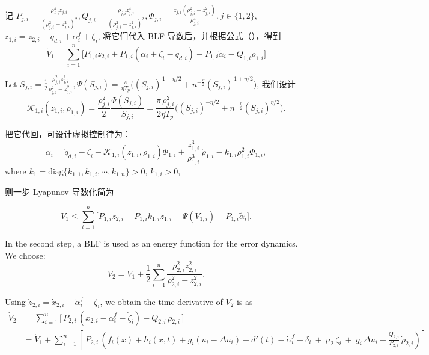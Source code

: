 \documentclass[pdflatex,sn-mathphys-num]{sn-jnl}%
\theoremstyle{thmstyleone}%
\theoremstyle{thmstyletwo}%
\theoremstyle{thmstylethree}%
\begin{document}
记
$
P_{j,i}=\frac{\rho_{j,i}^4 z_{j,i}}{(\rho_{j,i}^2-z_{j,i}^2)^2},
Q_{j,i}=\frac{\rho_{j,i} z_{j,i}^4}{(\rho_{j,i}^2-z_{j,i}^2)^2},
\Phi_{j,i}=\frac{z_{j,i}\left(\rho_{j,i}^{2}-z_{j,i}^{2}\right)}{\rho_{j,i}^{4}}, j\in\{1,2\}
$,
$\dot z_{1,i}= z_{2,i}-\dot q_{d,i}+\alpha^{f}_i+\zeta_i$, 将它们代入 BLF 导数后，并根据公式（），得到
$$
\dot V_1=\sum_{i=1}^n\!\Big[P_{1,i} z_{2,i}+P_{1,i}(\alpha_i+\zeta_i-\dot q_{d,i})-P_{1,i}\tilde\alpha_i-Q_{1,i}\dot\rho_{1,i}\Big]
$$

Let ${S_{j,i}}=\frac{1}{2}\frac{\rho_{j,i}^2 z_{j,i}^2}{\rho_{j,i}^2-z_{j,i}^2}, \Psi(S_{j,i})=\frac{\pi}{ \eta T_p}\Big((S_{j,i})^{\,1-\eta/2}+n^{-\frac{\eta}{2} }(S_{j,i})^{\,1+\eta/2}\Big)$, 我们设计
$$
\mathcal{K}_{1,i}(z_{1,i},\rho_{1,i})
=\frac{\rho_{j,i}^2}{2}\frac{\Psi(S_{j,i})}{S_{j,i}}
=\frac{\pi\,\rho_{j,i}^2}{2\eta T_p}\Big((S_{j,i})^{-\eta/2}+n^{-\frac{\eta}{2} }(S_{j,i})^{\eta/2}\Big).
$$

把它代回，可设计虚拟控制律为：
\begin{equation}\label{eq:25}
\alpha_i = \dot q_{d,i}-\zeta_i
-\mathcal{K}_{1,i}(z_{1,i},\rho_{1,i})\Phi_{1,i}
+\frac{z_{1,i}^3}{\rho_{1,i}^3}\,\dot\rho_{1,i}-k_{1,i} \rho_{1,i}^2 \Phi_{1,i},
\end{equation}
where $k_1=\mathrm{diag}\{k_{1,1},k_{1,i},\cdots,k_{1,n}\}>0$, $k_{1,i}>0$,

则一步 Lyapunov 导数化简为

$$
\dot V_1
\le \sum_{i=1}^n \Big[ P_{1,i} z_{2,i}
-P_{1,i} k_{1,i}z_{1,i}-\Psi(V_{1,i})-P_{1,i}\tilde\alpha_i
\Big].
$$


In the second step, a BLF is used as an energy function for the error dynamics. We choose:
\begin{equation}\label{eq:25}
	V_2= V_1+\frac{1}{2}\sum_{i=1}^{n} \frac{\rho_{2,i}^2 z_{2,i}^2}{\rho_{2,i}^2-z_{2,i}^2}. 
\end{equation}


Using $\dot z_{2,i}=\dot x_{2,i}-\dot\alpha_i^{f}-\dot\zeta_i$, we obtain the time derivative of $V_2$ is as
\begin{equation}
	\begin{aligned}
		\dot V_2& = \sum_{i=1}^n \Big[\,P_{2,i}\,(\dot x_{2,i}-\dot\alpha_i^{f}-\dot\zeta_i)-Q_{2,i}\,\dot\rho_{2,i}\,\Big]\\
		&
		 = \dot V_1+\sum_{i=1}^n \left[\,P_{2,i}\,\left(f_i(x)+h_i(x,t)+g_i(u_i-\Delta u_i)+d'(t)-\dot\alpha_i^{f}-\delta_i\ +\ \mu_2\,\zeta_i\ +\ g_i\,\Delta u_i-\frac{Q_{2,i}}{P_{2,i}}\,\dot\rho_{2,i} \right)\right]
	\end{aligned}
\end{equation}
\end{document}
